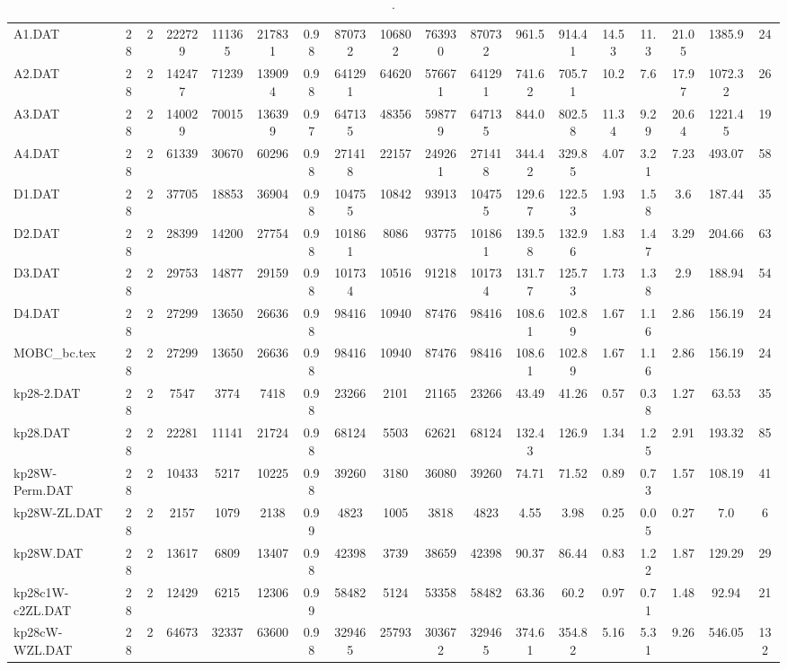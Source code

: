 \begin{sidewaystable}[h]
{\begin{tabular}{lccccccccccccccccc}
A1.DAT & 28 & 2 & 222729 & 111365 & 217831 & 0.98 & 870732 & 106802 & 763930 & 870732 & 961.5 & 914.41 & 14.53 & 11.3 & 21.05 & 1385.9 & 24\\
A2.DAT & 28 & 2 & 142477 & 71239 & 139094 & 0.98 & 641291 & 64620 & 576671 & 641291 & 741.62 & 705.71 & 10.2 & 7.6 & 17.97 & 1072.32 & 26\\
A3.DAT & 28 & 2 & 140029 & 70015 & 136399 & 0.97 & 647135 & 48356 & 598779 & 647135 & 844.0 & 802.58 & 11.34 & 9.29 & 20.64 & 1221.45 & 19\\
A4.DAT & 28 & 2 & 61339 & 30670 & 60296 & 0.98 & 271418 & 22157 & 249261 & 271418 & 344.42 & 329.85 & 4.07 & 3.21 & 7.23 & 493.07 & 58\\
D1.DAT & 28 & 2 & 37705 & 18853 & 36904 & 0.98 & 104755 & 10842 & 93913 & 104755 & 129.67 & 122.53 & 1.93 & 1.58 & 3.6 & 187.44 & 35\\
D2.DAT & 28 & 2 & 28399 & 14200 & 27754 & 0.98 & 101861 & 8086 & 93775 & 101861 & 139.58 & 132.96 & 1.83 & 1.47 & 3.29 & 204.66 & 63\\
D3.DAT & 28 & 2 & 29753 & 14877 & 29159 & 0.98 & 101734 & 10516 & 91218 & 101734 & 131.77 & 125.73 & 1.73 & 1.38 & 2.9 & 188.94 & 54\\
D4.DAT & 28 & 2 & 27299 & 13650 & 26636 & 0.98 & 98416 & 10940 & 87476 & 98416 & 108.61 & 102.89 & 1.67 & 1.16 & 2.86 & 156.19 & 24\\
MOBC\_bc.tex & 28 & 2 & 27299 & 13650 & 26636 & 0.98 & 98416 & 10940 & 87476 & 98416 & 108.61 & 102.89 & 1.67 & 1.16 & 2.86 & 156.19 & 24\\
kp28-2.DAT & 28 & 2 & 7547 & 3774 & 7418 & 0.98 & 23266 & 2101 & 21165 & 23266 & 43.49 & 41.26 & 0.57 & 0.38 & 1.27 & 63.53 & 35\\
kp28.DAT & 28 & 2 & 22281 & 11141 & 21724 & 0.98 & 68124 & 5503 & 62621 & 68124 & 132.43 & 126.9 & 1.34 & 1.25 & 2.91 & 193.32 & 85\\
kp28W-Perm.DAT & 28 & 2 & 10433 & 5217 & 10225 & 0.98 & 39260 & 3180 & 36080 & 39260 & 74.71 & 71.52 & 0.89 & 0.73 & 1.57 & 108.19 & 41\\
kp28W-ZL.DAT & 28 & 2 & 2157 & 1079 & 2138 & 0.99 & 4823 & 1005 & 3818 & 4823 & 4.55 & 3.98 & 0.25 & 0.05 & 0.27 & 7.0 & 6\\
kp28W.DAT & 28 & 2 & 13617 & 6809 & 13407 & 0.98 & 42398 & 3739 & 38659 & 42398 & 90.37 & 86.44 & 0.83 & 1.22 & 1.87 & 129.29 & 29\\
kp28c1W-c2ZL.DAT & 28 & 2 & 12429 & 6215 & 12306 & 0.99 & 58482 & 5124 & 53358 & 58482 & 63.36 & 60.2 & 0.97 & 0.71 & 1.48 & 92.94 & 21\\
kp28cW-WZL.DAT & 28 & 2 & 64673 & 32337 & 63600 & 0.98 & 329465 & 25793 & 303672 & 329465 & 374.61 & 354.82 & 5.16 & 5.31 & 9.26 & 546.05 & 132\\
\bottomrule
\end{tabular}%
}%
\caption{.}
\label{tab:table_bc}
\end{sidewaystable}

